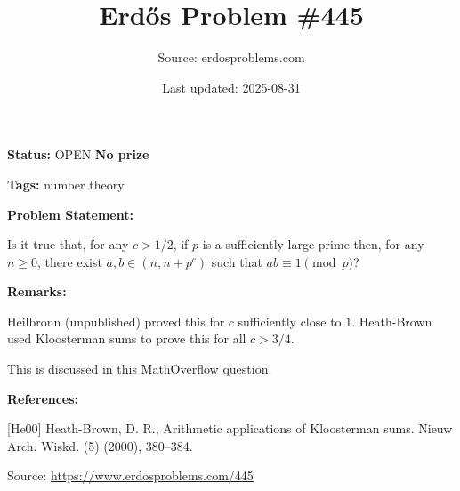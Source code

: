 \documentclass{article}
\title{Erd\H{o}s Problem \#445}
\date{Last updated: 2025-08-31}
\author{Source: erdosproblems.com}
\begin{document}
\maketitle

\noindent\textbf{Status:} OPEN \quad \textbf{No prize}

\noindent\textbf{Tags:} number theory

\medskip
\noindent\textbf{Problem Statement:}

Is it true that, for any $c>1/2$, if $p$ is a sufficiently large prime then, for any $n\geq 0$, there exist $a,b\in(n,n+p^c)$ such that $ab\equiv 1\pmod{p}$?

\bigskip
\noindent\textbf{Remarks:}

Heilbronn (unpublished) proved this for $c$ sufficiently close to $1$. Heath-Brown \cite{He00} used Kloosterman sums to prove this for all $c>3/4$. 

This is discussed in this MathOverflow question.

\bigskip
\noindent\textbf{References:}

[He00] Heath-Brown, D. R., Arithmetic applications of {K}loosterman sums. Nieuw Arch. Wiskd. (5) (2000), 380--384.

\bigskip
\noindent\small{Source: \url{https://www.erdosproblems.com/445}}
\end{document}
